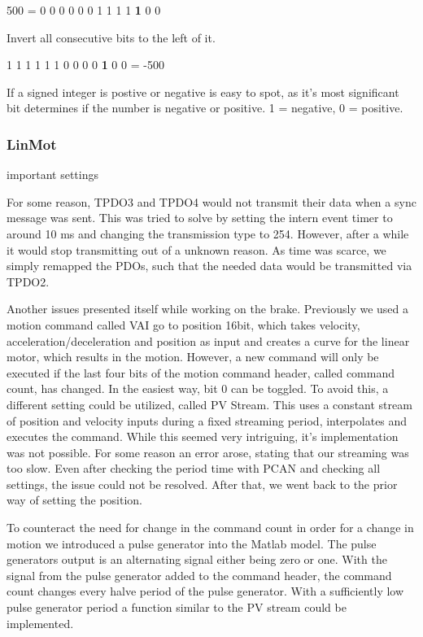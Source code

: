 500 = 0 0 0 0  0 0 1  1 1 1  \textbf{1} 0 0

Invert all consecutive bits to the left of it.

1 1 1 1  1 1 0  0 0 0  \textbf{1} 0 0 = -500

If a signed integer is postive or negative is easy to spot, as it's most significant bit determines if the number is negative or positive. 1 = negative, 0 = positive.

\subsubsection{LinMot}
important settings

For some reason, TPDO3 and TPDO4 would not transmit their data when a sync message was sent. This was tried to solve by setting the intern event timer to around 10 ms and changing the transmission type to 254. However, after a while it would stop transmitting out of a unknown reason. As time was scarce, we simply remapped the PDOs, such that the needed data would be transmitted via TPDO2. 


Another issues presented itself while working on the brake. Previously we used a motion command called VAI go to position 16bit, which takes velocity, acceleration/deceleration and position as input and creates a curve for the linear motor, which results in the motion. However, a new command will only be executed if the last four bits of the motion command header, called command count, has changed. In the easiest way, bit 0 can be toggled. 
To avoid this, a different setting could be utilized, called PV Stream. This uses a constant stream of position and velocity inputs during a fixed streaming period, interpolates and executes the command. While this seemed very intriguing, it's implementation was not possible. For some reason an error arose, stating that our streaming was too slow. Even after checking the period time with PCAN and checking all settings, the issue could not be resolved.
After that, we went back to the prior way of setting the position.

To counteract the need for change in the command count in order for a change in motion we introduced a pulse generator into the Matlab model.
The pulse generators output is an alternating signal either being zero or one. With the signal from the pulse generator added to the command header, the command count changes every halve period of the pulse generator. With a sufficiently low pulse generator period a function similar to the PV stream could be implemented.

